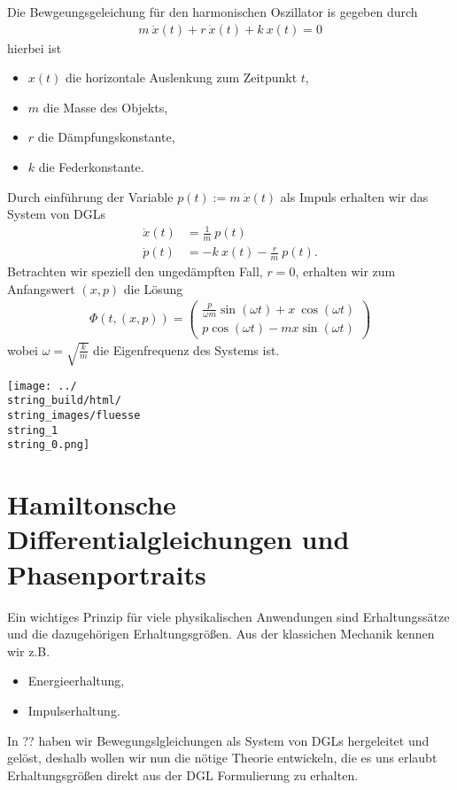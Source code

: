 \begin{example}{}{}



Die Bewgeungsgeleichung für den harmonischen Oszillator is gegeben durch
\begin{align*}
m~\ddot{x}(t) + r~\dot{x}(t) + k~x(t)=0
\end{align*}
hierbei ist
\begin{itemize}
\item {} 
\(x(t)\) die horizontale Auslenkung zum Zeitpunkt \(t\),

\item {} 
\(m\) die Masse des Objekts,

\item {} 
\(r\) die Dämpfungskonstante,

\item {} 
\(k\) die Federkonstante.

\end{itemize}

Durch einführung der Variable \(p(t):= m~\dot{x}(t)\) als Impuls erhalten wir das System von DGLs
\begin{align*}
\dot{x}(t) &= \frac{1}{m}~p(t) \\
\dot{p}(t) &= -k~x(t) - \frac{r}{m}~p(t).
\end{align*}
Betrachten wir speziell den ungedämpften Fall, \(r=0\), erhalten wir zum Anfangswert \((x,p)\) die Lösung
\begin{align*}
\Phi(t, (x,p)) = 
\begin{pmatrix}
\frac{p}{\omega m}\sin(\omega t) + x~\cos(\omega t)\\
p \cos(\omega t) - m x \sin(\omega t)
\end{pmatrix}
\end{align*}
wobei \(\omega=\sqrt{\frac{k}{m}}\) die Eigenfrequenz des Systems ist.
\end{example}

\noindent\texttt{[image: ../\\string\_build/html/\\string\_images/fluesse\\string\_1\\string\_0.png]}


\section{Hamiltonsche Differentialgleichungen und Phasenportraits}
\label{\detokenize{ode/hamilton:hamiltonsche-differentialgleichungen-und-phasenportraits}}\label{\detokenize{ode/hamilton::doc}}
Ein wichtiges Prinzip für viele physikalischen Anwendungen sind Erhaltungssätze und die dazugehörigen Erhaltungsgrößen. Aus der klassichen Mechanik kennen wir z.B.
\begin{itemize}
\item {} 
Energieerhaltung,

\item {} 
Impulserhaltung.

\end{itemize}

In ?? haben wir Bewegungslgleichungen als System von DGLs hergeleitet und gelöst, deshalb wollen wir nun die nötige Theorie entwickeln, die es uns erlaubt Erhaltungsgrößen direkt aus der DGL Formulierung zu erhalten.
\label{ode/hamilton:example-0}
\begin{example}{}{}


\end{example}


